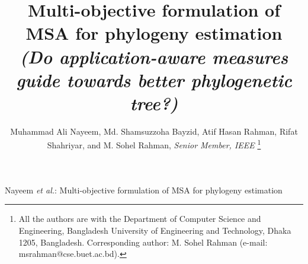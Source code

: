 \documentclass[journal]{IEEEtran}
\begin{document}
\title{Multi-objective formulation of MSA for phylogeny estimation 
	\\ \textit{\normalsize{(Do application-aware measures guide towards better phylogenetic tree?)}} }
\author{Muhammad Ali Nayeem,
	Md. Shamsuzzoha Bayzid,
	Atif Hasan Rahman,
	Rifat Shahriyar, and M. Sohel Rahman, \textit{Senior Member, IEEE}
\thanks{All the authors are with the Department of Computer Science and Engineering, Bangladesh University of Engineering and Technology, Dhaka 1205, Bangladesh. Corresponding author: M. Sohel Rahman (e-mail: msrahman@cse.buet.ac.bd).}
}


%
{Nayeem \MakeLowercase{\textit{et al.}}: Multi-objective formulation of MSA for phylogeny estimation}

\maketitle
\end{document}
